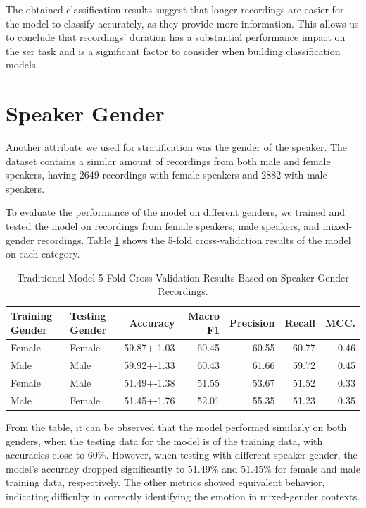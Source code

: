 The obtained classification results suggest that longer recordings are easier for the model to classify accurately, as they provide more information. This allows us to conclude that recordings' duration has a substantial performance impact on the \ac{ser} task and is a significant factor to consider when building classification models.

\section{Speaker Gender}

Another attribute we used for stratification was the gender of the speaker. The dataset contains a similar amount of recordings from both male and female speakers, having 2649 recordings with female speakers and 2882 with male speakers.

To evaluate the performance of the model on different genders, we trained and tested the model on recordings from female speakers, male speakers, and mixed-gender recordings. Table \ref{5:gender} shows the 5-fold cross-validation results of the model on each category.

\begin{table}[H]
	\centering
	\caption{Traditional Model 5-Fold Cross-Validation Results Based on Speaker Gender Recordings.}
	\label{5:gender}
	\begin{tabular}{llrrrrr}
		\toprule
		Training Gender & Testing Gender & Accuracy    &   Macro F1 &   Precision &   Recall &   MCC. \\
		\midrule
		Female	& Female & 59.87+-1.03 & 60.45 & 60.55 & 60.77 & 0.46 \\
		Male 	& Male	 & 59.92+-1.33 & 60.43 & 61.66 & 59.72 & 0.45 \\
		Female  & Male	 & 51.49+-1.38 & 51.55 & 53.67 & 51.52 & 0.33 \\
		Male    & Female & 51.45+-1.76 & 52.01 & 55.35 & 51.23 & 0.35 \\
		\bottomrule
	\end{tabular}
\end{table}

From the table, it can be observed that the model performed similarly on both genders, when the testing data for the model is of the training data, with accuracies close to 60\%. However, when testing with different speaker gender, the model's accuracy dropped significantly to 51.49\% and 51.45\% for female and male training data, respectively. The other metrics showed equivalent behavior, indicating difficulty in correctly identifying the emotion in mixed-gender contexts.

